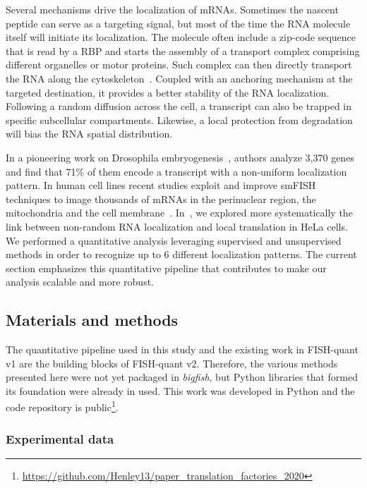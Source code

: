 Several mechanisms drive the localization of \ac{mRNA}s.
Sometimes the nascent peptide can serve as a targeting signal, but most of the time the \ac{RNA} molecule itself will initiate its localization.
The molecule often include a zip-code sequence that is read by a \ac{RBP} and starts the assembly of a transport complex comprising different organelles or motor proteins.
Such complex can then directly transport the \ac{RNA} along the cytoskeleton~\cite{Blower_2013}.
Coupled with an anchoring mechanism at the targeted destination, it provides a better stability of the \ac{RNA} localization.
Following a random diffusion across the cell, a transcript can also be trapped in specific subcellular compartments.
Likewise, a local protection from degradation will bias the \ac{RNA} spatial distribution.

In a pioneering work on Drosophila embryogenesis~\cite{lecuyer_global_2007}, authors analyze 3,370 genes and find that 71\% of them encode a transcript with a non-uniform localization pattern.
In human cell lines recent studies exploit and improve \ac{smFISH} techniques to image thousands of \ac{mRNA}s in the perinuclear region, the mitochondria and the cell membrane~\cite{battich_image-based_2013, Chen_2015, eng_seqfish_2019, Xia_2019}.
In~\cite{CHOUAIB_2020}, we explored more systematically the link between non-random \ac{RNA} localization and local translation in HeLa cells.
We performed a quantitative analysis leveraging supervised and unsupervised methods in order to recognize up to 6 different localization patterns.
The current section emphasizes this quantitative pipeline that contributes to make our analysis scalable and more robust.

\subsection{Materials and methods}
\label{subsec:materials_general_pattern}

The quantitative pipeline used in this study and the existing work in FISH-quant v1 are the building blocks of FISH-quant v2.
Therefore, the various methods presented here were not yet packaged in \emph{bigfish}, but Python libraries that formed its foundation were already in used.
This work was developed in Python and the code repository is public\footnote{\url{https://github.com/Henley13/paper_translation_factories_2020}}.

\subsubsection{Experimental data}

